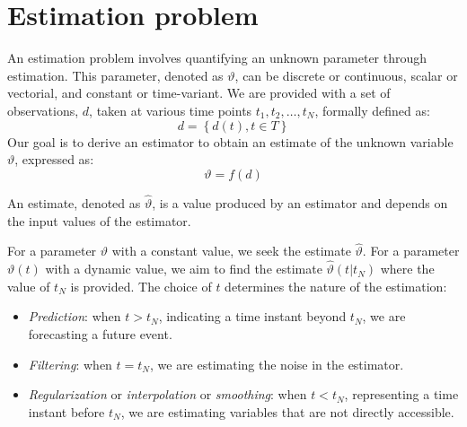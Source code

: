 \section{Estimation problem}

An estimation problem involves quantifying an unknown parameter through estimation. 
This parameter, denoted as $\vartheta$, can be discrete or continuous, scalar or vectorial, and constant or time-variant.
We are provided with a set of observations, $d$, taken at various time points $t_1, t_2, \dots, t_N$, formally defined as: 
\[d=\left\{ d(t), t \in T\right\}\]
Our goal is to derive an estimator to obtain an estimate of the unknown variable $\vartheta$, expressed as:
\[\vartheta=f(d)\]
\begin{definition}
    An estimate, denoted as $\hat{\vartheta}$, is a value produced by an estimator and depends on the input values of the estimator.
\end{definition}
For a parameter $\vartheta$ with a constant value, we seek the estimate $\hat{\vartheta}$. 
For a parameter $\vartheta(t)$ with a dynamic value, we aim to find the estimate $\hat{\vartheta}(t | t_N)$ where the value of $t_N$ is provided.
The choice of $t$ determines the nature of the estimation:
\begin{itemize}
    \item \textit{Prediction}: when $t > t_N$, indicating a time instant beyond $t_N$, we are forecasting a future event.
    \item \textit{Filtering}: when $t = t_N$, we are estimating the noise in the estimator. 
    \item \textit{Regularization} or \textit{interpolation} or \textit{smoothing}: when $t < t_N$, representing a time instant before $t_N$, we are estimating variables that are not directly accessible.
\end{itemize}